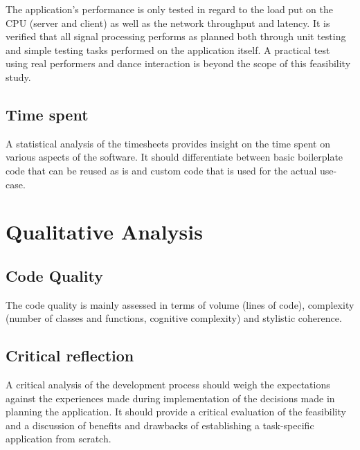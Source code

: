 The application's performance is only tested in regard to the load put on the \ac{CPU} (server and client) as well as the network throughput and latency. It is verified that all signal processing performs as planned both through unit testing and simple testing tasks performed on the application itself. A practical test using real performers and dance interaction is beyond the scope of this feasibility study.

\subsection{Time spent}

A statistical analysis of the timesheets provides insight on the time spent on various aspects of the software. It should differentiate between basic boilerplate code that can be reused as is and custom code that is used for the actual use-case.

\section{Qualitative Analysis}

\subsection{Code Quality}

The code quality is mainly assessed in terms of volume (lines of code), complexity (number of classes and functions, cognitive complexity) and stylistic coherence.

\subsection{Critical reflection}

A critical analysis of the development process should weigh the expectations against the experiences made during implementation of the decisions made in planning the application. It should provide a critical evaluation of the feasibility and a discussion of benefits and drawbacks of establishing a task-specific application from scratch.
